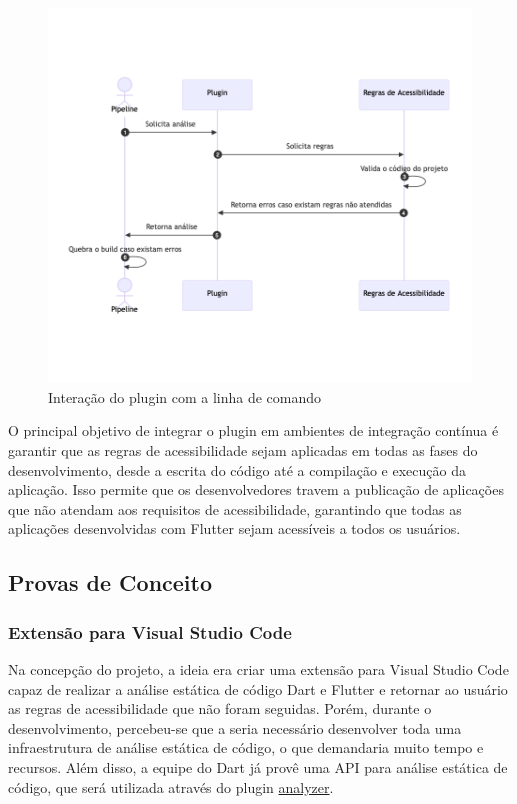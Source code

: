 \begin{figure}[!h]
	\centering
	\caption{Interação do plugin com a linha de comando}\label{fig:diagrama-sequencia-linha-comando}
	\includegraphics[width=325pt]{Assets/DiagramaSequenciaLinhaComando.png}
\end{figure}

O principal objetivo de integrar o plugin em ambientes de integração contínua é garantir que as regras de acessibilidade sejam aplicadas em todas as fases do desenvolvimento, desde a escrita do código até a compilação e execução da aplicação. Isso permite que os desenvolvedores travem a publicação de aplicações que não atendam aos requisitos de acessibilidade, garantindo que todas as aplicações desenvolvidas com Flutter sejam acessíveis a todos os usuários.

\subsection{Provas de Conceito}

\subsubsection{Extensão para Visual Studio Code}

Na concepção do projeto, a ideia era criar uma extensão para Visual Studio Code capaz de realizar a análise estática de código Dart e Flutter e retornar ao usuário as regras de acessibilidade que não foram seguidas. Porém, durante o desenvolvimento, percebeu-se que a seria necessário desenvolver toda uma infraestrutura de análise estática de código, o que demandaria muito tempo e recursos. Além disso, a equipe do Dart já provê uma API para análise estática de código, que será utilizada através do plugin \href{https://pub.dev/packages/analyzer}{analyzer}. 

